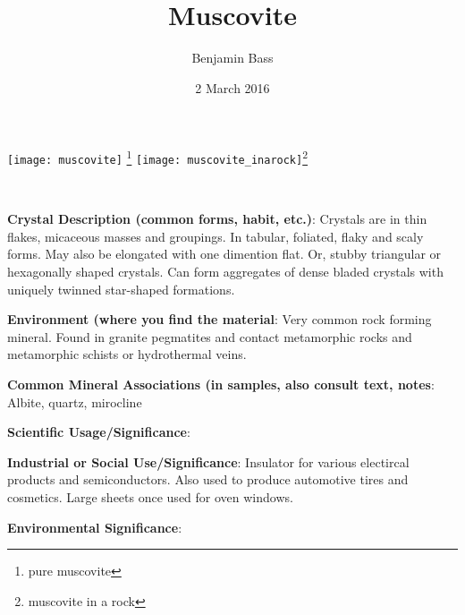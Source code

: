 \documentclass[10pt]{article}
\author{Benjamin Bass}
\date{2 March 2016}
\title{\vspace{-2.0cm}Muscovite} %
\begin{document}
\maketitle


\begin{center}
  \texttt{[image: muscovite]}
\footnote{pure muscovite}
  \texttt{[image: muscovite\_inarock]}\footnote{muscovite in a rock}
\end{center}



\
\
\
\
\
\
\
\
\
\

\begin{framed}
  \textbf{Crystal Description (common forms, habit, etc.)}: Crystals are in thin flakes, micaceous masses and groupings. In tabular, foliated, flaky and scaly forms. May also be elongated with one dimention flat. Or, stubby triangular or hexagonally shaped crystals. Can form aggregates of dense bladed crystals with uniquely twinned star-shaped formations.
\end{framed}

\begin{framed}
  \textbf{Environment (where you find the material}: Very common rock forming mineral. Found in granite pegmatites and contact metamorphic rocks and metamorphic schists or hydrothermal veins.
\end{framed}

\begin{framed}
  \textbf{Common Mineral Associations (in samples, also consult text, notes}: Albite, quartz, mirocline
\end{framed}

\begin{framed}
  \textbf{Scientific Usage/Significance}: 
\end{framed}

\begin{framed}
  \textbf{Industrial or Social Use/Significance}: Insulator for various electircal products and semiconductors. Also used to produce automotive tires and cosmetics. Large sheets once used for oven windows.
\end{framed}

\begin{framed}
  \textbf{Environmental Significance}: 
\end{framed}

\end{document}
